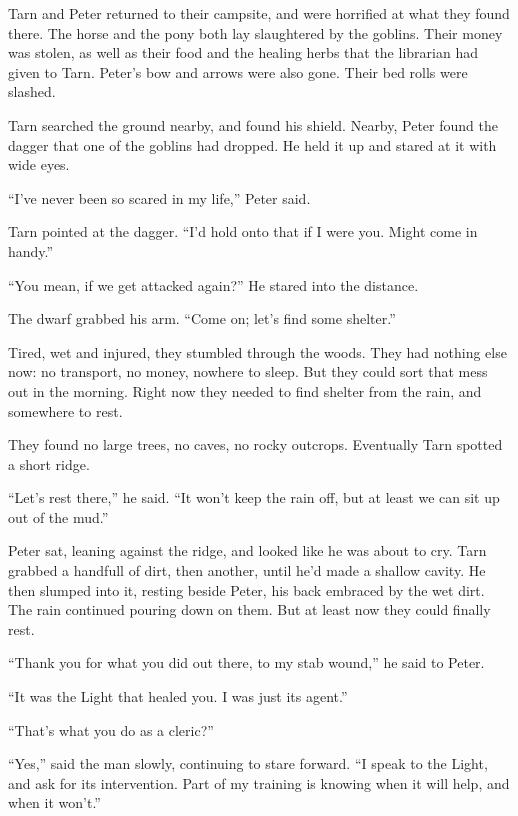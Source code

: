 
Tarn and Peter returned to their campsite, and were horrified at what they found there.  The horse and the pony both lay slaughtered by the goblins.  Their money was stolen, as well as their food and the healing herbs that the librarian had given to Tarn.  Peter's bow and arrows were also gone.  Their bed rolls were slashed.

Tarn searched the ground nearby, and found his shield.  Nearby, Peter found the dagger that one of the goblins had dropped.  He held it up and stared at it with wide eyes.

``I've never been so scared in my life,'' Peter said.

Tarn pointed at the dagger.  ``I'd hold onto that if I were you.  Might come in handy.''

``You mean, if we get attacked again?''  He stared into the distance.

The dwarf grabbed his arm.  ``Come on; let's find some shelter.''

Tired, wet and injured, they stumbled through the woods.  They had nothing else now: no transport, no money, nowhere to sleep.  But they could sort that mess out in the morning.  Right now they needed to find shelter from the rain, and somewhere to rest.

They found no large trees, no caves, no rocky outcrops.  Eventually Tarn spotted a short ridge.

``Let's rest there,'' he said.  ``It won't keep the rain off, but at least we can sit up out of the mud.''

Peter sat, leaning against the ridge, and looked like he was about to cry.  Tarn grabbed a handfull of dirt, then another, until he'd made a shallow cavity.  He then slumped into it, resting beside Peter, his back embraced by the wet dirt.  The rain continued pouring down on them.  But at least now they could finally rest.

``Thank you for what you did out there, to my stab wound,'' he said to Peter.

``It was the Light that healed you.  I was just its agent.''

``That's what you do as a cleric?''

``Yes,'' said the man slowly, continuing to stare forward.  ``I speak to the Light, and ask for its intervention.  Part of my training is knowing when it will help, and when it won't.''

